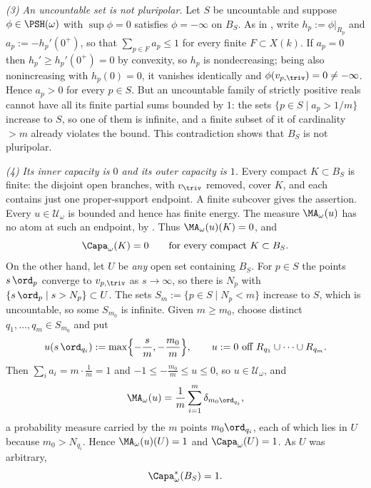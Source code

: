 \begin{example}
\emph{(3) An uncountable set is not pluripolar.}  Let $S$ be uncountable
and suppose $\phi\in\PSH(\omega)$ with $\sup\phi=0$ satisfies
$\phi=-\infty$ on $B_S$.  As in , write
$h_p:=\phi|_{R_p}$ and $a_p:=-h_p'(0^+)$, so that
$\sum_{p\in F}a_p\le1$ for every finite $F\subset X(k)$.  If
$a_p=0$ then $h_p'\ge h_p'(0^+)=0$ by convexity, so $h_p$ is
nondecreasing; being also nonincreasing with $h_p(0)=0$, it vanishes
identically and $\phi(v_{p,\triv})=0\ne-\infty$.  Hence $a_p>0$ for
every $p\in S$.  But an uncountable family of strictly positive reals
cannot have all its finite partial sums bounded by $1$: the sets
$\{p\in S\mid a_p>1/m\}$ increase to $S$, so one of them is infinite,
and a finite subset of it of cardinality $>m$ already violates the
bound.  This contradiction shows that $B_S$ is not pluripolar.

\emph{(4) Its inner capacity is $0$ and its outer capacity is $1$.}
Every compact $K\subset B_S$ is finite: the disjoint open branches,
with $v_{\triv}$ removed, cover $K$, and each contains just one
proper-support endpoint.  A finite subcover gives the assertion.
Every $u\in\mathcal U_\omega$ is bounded and hence has finite energy.
The measure $\MA_\omega(u)$ has no atom at such an endpoint, by
.  Thus $\MA_\omega(u)(K)=0$, and
\[
 \Capa_\omega(K)=0\qquad\text{for every compact }K\subset B_S .
\]
On the other hand, let $U$ be \emph{any} open set containing $B_S$.
For $p\in S$ the points $s\,\ord_p$ converge to $v_{p,\triv}$ as
$s\to\infty$, so there is $N_p$ with
$\{s\,\ord_p\mid s>N_p\}\subset U$.  The sets
$S_m:=\{p\in S\mid N_p<m\}$ increase to $S$, which is uncountable, so
some $S_{m_0}$ is infinite.  Given $m\ge m_0$, choose distinct
$q_1,\dots,q_m\in S_{m_0}$ and put
\[
 u(s\,\ord_{q_i}):=\max\Bigl\{-\frac sm,-\frac{m_0}m\Bigr\},
 \qquad u:=0\ \text{off}\ R_{q_1}\cup\dots\cup R_{q_m}.
\]
Then $\sum_ia_i=m\cdot\tfrac1m=1$ and
$-1\le-\tfrac{m_0}m\le u\le0$, so $u\in\mathcal U_\omega$, and
\[
 \MA_\omega(u)=\frac1m\sum_{i=1}^m\delta_{m_0\ord_{q_i}} ,
\]
a probability measure carried by the $m$ points $m_0\ord_{q_i}$, each of
which lies in $U$ because $m_0>N_{q_i}$.  Hence
$\MA_\omega(u)(U)=1$ and $\Capa_\omega(U)=1$.  As $U$ was arbitrary,
\[
 \Capa^*_\omega(B_S)=1 .
\]


\end{example}
